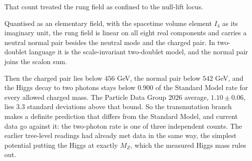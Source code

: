 \documentclass[11pt]{article}
\theoremstyle{definition}
\theoremstyle{plain}
\begin{document}
That count treated the rung field as confined to the null-lift locus.

Quantised as an elementary field, with the spacetime volume element $I_{4}$ as its imaginary unit, the rung field is linear on all eight real components and carries a neutral normal pair besides the neutral mode and the charged pair. In two-doublet language it is the scale-invariant two-doublet model, and the normal pair joins the scalon sum.

Then the charged pair lies below $456$ GeV, the normal pair below $542$ GeV, and the Higgs decay to two photons stays below $0.900$ of the Standard Model rate for every allowed charged mass. The Particle Data Group 2026 average, $1.10 \pm 0.06$, lies $3.3$ standard deviations above that bound. So the transmutation branch makes a definite prediction that differs from the Standard Model, and current data go against it: the two-photon rate is one of three independent counts. The earlier tree-level readings had already met data in the same way, the simplest potential putting the Higgs at exactly $M_{Z}$, which the measured Higgs mass rules out.
\end{document}

